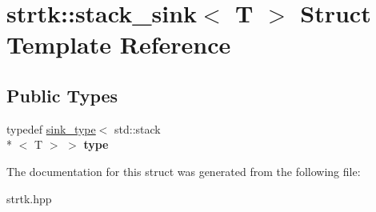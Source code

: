 \hypertarget{structstrtk_1_1stack__sink}{\section{strtk\-:\-:stack\-\_\-sink$<$ T $>$ Struct Template Reference}
\label{structstrtk_1_1stack__sink}
}
\subsection*{Public Types}
\begin{DoxyCompactItemize}
\item 
\hypertarget{structstrtk_1_1stack__sink_a3fe5388dd80c99df351f3440a3987294}{typedef \hyperlink{classstrtk_1_1sink__type}{sink\-\_\-type}$<$ std\-::stack\\*
$<$ T $>$ $>$ {\bfseries type}}\label{structstrtk_1_1stack__sink_a3fe5388dd80c99df351f3440a3987294}

\end{DoxyCompactItemize}


The documentation for this struct was generated from the following file\-:\begin{DoxyCompactItemize}
\item 
strtk.\-hpp\end{DoxyCompactItemize}
